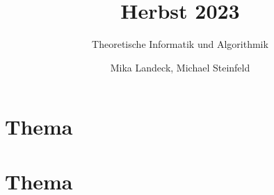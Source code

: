 \documentclass[stex]{ddifau}
\title{Herbst 2023}
\subtitle{Theoretische Informatik und Algorithmik}
\author{Mika Landeck, Michael Steinfeld}
\begin{document}
\maketitle
\tableofcontents

\newpage
\section{Thema}

\clearpage

\section{Thema}

\end{document}

